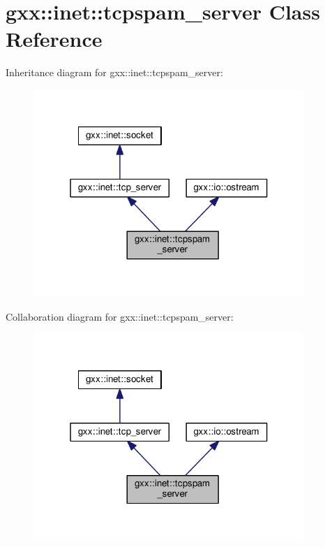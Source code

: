 \hypertarget{classgxx_1_1inet_1_1tcpspam__server}{}\section{gxx\+:\+:inet\+:\+:tcpspam\+\_\+server Class Reference}
\label{classgxx_1_1inet_1_1tcpspam__server}


Inheritance diagram for gxx\+:\+:inet\+:\+:tcpspam\+\_\+server\+:
\nopagebreak
\begin{figure}[H]
\begin{center}
\leavevmode
\includegraphics[width=292pt]{classgxx_1_1inet_1_1tcpspam__server__inherit__graph}
\end{center}
\end{figure}


Collaboration diagram for gxx\+:\+:inet\+:\+:tcpspam\+\_\+server\+:
\nopagebreak
\begin{figure}[H]
\begin{center}
\leavevmode
\includegraphics[width=292pt]{classgxx_1_1inet_1_1tcpspam__server__coll__graph}
\end{center}
\end{figure}
